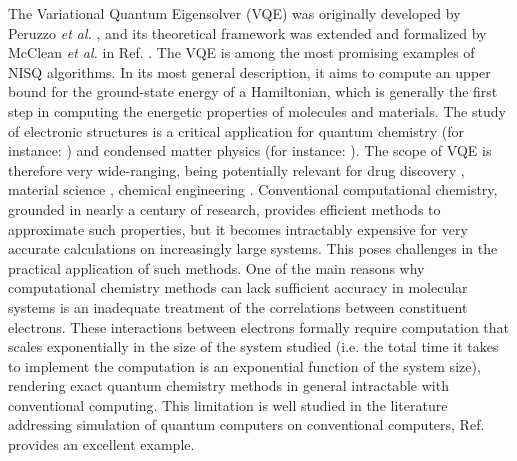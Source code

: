 The Variational Quantum Eigensolver (VQE) was originally developed by Peruzzo {\it et al.} \cite{Peruzzo2014}, and its theoretical framework was extended and formalized by McClean \textit{et al.} in Ref. \cite{mccleanTheoryVariationalHybrid2015}. The VQE is among the most promising examples of NISQ algorithms. In its most general description, it aims to compute an upper bound for the ground-state energy of a Hamiltonian, which is generally the first step in computing the energetic properties of molecules and materials. The study of electronic structures is a critical application for quantum chemistry (for instance: \cite{Deglmann2014, WilliamsNoonan2017, Heifetz2020}) and condensed matter physics (for instance: \cite{Continentino2021, VanderVen2020}). The scope of VQE is therefore very wide-ranging, being potentially relevant for drug discovery \cite{Cao2018_DD, Blunt2022}, material science \cite{Lordi2021}, chemical engineering \cite{Cao2019_QC}. Conventional computational chemistry, grounded in nearly a century of research, provides efficient methods to approximate such properties, but it becomes intractably expensive for very accurate calculations on increasingly large systems. This poses challenges in the practical application of such methods. One of the main reasons why computational chemistry methods can lack sufficient accuracy in molecular systems is an inadequate treatment of the correlations between constituent electrons. These interactions between electrons formally require computation that scales exponentially in the size of the system studied (i.e. the total time it takes to implement the computation is an exponential function of the system size), rendering exact quantum chemistry methods in general intractable with conventional computing. This limitation is well studied in the literature addressing simulation of quantum computers on conventional computers, Ref.~\cite{Zhou2020} provides an excellent example. 

